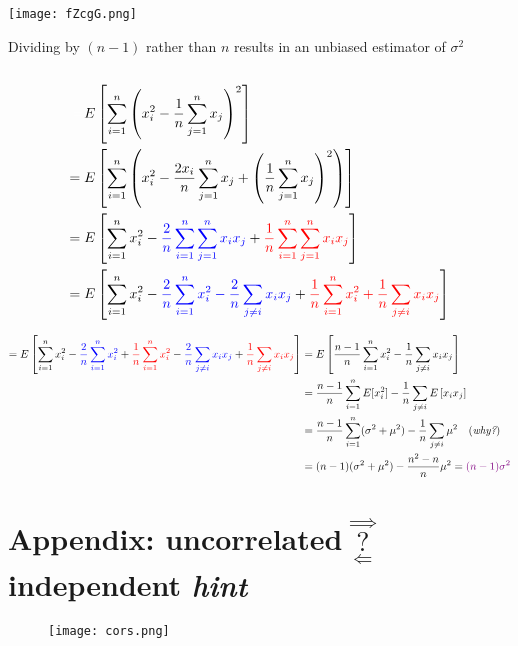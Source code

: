 \documentclass[11pt, oneside]{article}
\begin{document}
\begin{minipage}{.375\linewidth} 

   \texttt{[image: fZcgG.png]}  
   
   Dividing by $(n-1)$ rather than $n$ results in an unbiased estimator of $\sigma^2$\\

\end{minipage}
\begin{minipage}{.05\linewidth}
${}$
\end{minipage}
\begin{minipage}{.625\linewidth} 
\begin{align*} 
\textcolor{white}{=} {}& E\left[\sum_{i=1}^n\left(x_i^2-\frac{1}{n}\sum_{j=1}^nx_j\right)^2\right] \\
= {}& E\left[\sum_{i=1}^n\left(x_i^2-\frac{2x_i}{n}\sum_{j=1}^nx_j + 
\left(\frac{1}{n}\sum_{j=1}^nx_j\right)^2\right)\right] \\ 
= {}& E\left[\sum_{i=1}^nx_i^2-\textcolor{blue}{\frac{2}{n} \sum_{i=1}^n \sum_{j=1}^nx_ix_j} + 
\textcolor{red}{\frac{1}{n} \sum_{i=1}^n\sum_{j=1}^nx_ix_j}\right] \\ 
= {}& E\left[\sum_{i=1}^nx_i^2 - \textcolor{blue}{\frac{2}{n}\sum_{i=1}^nx_i^2 -\frac{2}{n}\sum_{j\not=i}x_ix_j} + 
\textcolor{red}{\frac{1}{n}\sum_{i=1}^nx_i^2 + \frac{1}{n}\sum_{j\not=i}x_ix_j} \right] 
\end{align*}
\end{minipage}

\begin{align*}
= E\left[\sum_{i=1}^nx_i^2 - \textcolor{blue}{\frac{2}{n}\sum_{i=1}^nx_i^2} + \textcolor{red}{\frac{1}{n}\sum_{i=1}^nx_i^2} 
 -\textcolor{blue}{\frac{2}{n}\sum_{j\not=i}x_ix_j}  
 + \textcolor{red}{\frac{1}{n}\sum_{j\not=i}x_ix_j} \right] 
 = {}& E\left[\textcolor{black}{\frac{n-1}{n}\sum_{i=1}^nx_i^2} 
 -\textcolor{black}{\frac{1}{n}\sum_{j\not=i}x_ix_j}  \right] \\  
 = {}& \textcolor{black}{\frac{n-1}{n}\sum_{i=1}^n E[x_i^2] } 
 -\textcolor{black}{\frac{1}{n} \sum_{j\not=i} E\left[x_ix_j\right] }   \\ 
 = {}& \textcolor{black}{\frac{n-1}{n}\sum_{i=1}^n (\sigma^2 + \mu^2) } 
 -\textcolor{black}{\frac{1}{n} \sum_{j\not=i} \mu^2 } \quad (\emph{\textrm{why?}})  \\ 
 = {}& \textcolor{black}{(n-1) (\sigma^2 + \mu^2) } 
 -\textcolor{black}{\frac{n^2-n}{n} \mu^2 }   =  \textcolor{violet}{(n-1)\sigma^2}
\end{align*}


\section*{Appendix: uncorrelated $\overset{\Longrightarrow}{\underset{\Longleftarrow}{?}}$ independent \emph{hint}}

\begin{figure}[h] 
   \centering
   \texttt{[image: cors.png]}  
\end{figure}  
\end{document}
